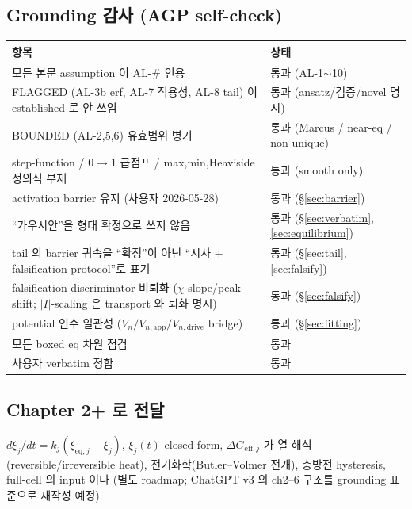 \documentclass[11pt,a4paper]{article}
\newcommand{\eff}{\mathrm{eff}}
\newcommand{\eq}{\mathrm{eq}}
\newcommand{\app}{\mathrm{app}}
\newcommand{\dimedrive}{\mathrm{drive}}
\begin{document}
\subsection{Grounding 감사 (AGP self-check)}
\begin{longtable}{p{} p{}}
\toprule 항목 & 상태 \\ \midrule \endhead
모든 본문 assumption 이 AL-\# 인용 & 통과 (AL-1$\sim$10) \\
FLAGGED (AL-3b erf, AL-7 적용성, AL-8 tail) 이 established 로 안 쓰임 & 통과 (ansatz/검증/novel 명시) \\
BOUNDED (AL-2,5,6) 유효범위 병기 & 통과 (Marcus / near-eq / non-unique) \\
step-function / $0\!\to\!1$ 급점프 / max,min,Heaviside 정의식 부재 & 통과 (smooth only) \\
activation barrier 유지 (사용자 2026-05-28) & 통과 (\S\ref{sec:barrier}) \\
``가우시안''을 형태 확정으로 쓰지 않음 & 통과 (\S\ref{sec:verbatim},\ref{sec:equilibrium}) \\
tail 의 barrier 귀속을 ``확정''이 아닌 ``시사 + falsification protocol''로 표기 & 통과 (\S\ref{sec:tail},\ref{sec:falsify}) \\
falsification discriminator 비퇴화 ($\chi$-slope/peak-shift; $|I|$-scaling 은 transport 와 퇴화 명시) & 통과 (\S\ref{sec:falsify}) \\
potential 인수 일관성 ($V_n/V_{n,\app}/V_{n,\dimedrive}$ bridge) & 통과 (\S\ref{sec:fitting}) \\
모든 boxed eq 차원 점검 & 통과 \\
사용자 verbatim 정합 & 통과 \\
\bottomrule
\end{longtable}

\subsection{Chapter 2+ 로 전달}
$d\xi_j/dt=k_j(\xi_{\eq,j}-\xi_j)$, $\xi_j(t)$ closed-form, $\Delta G_{\eff,j}$ 가 열
해석(reversible/irreversible heat), 전기화학(Butler--Volmer 전개), 충방전 hysteresis,
full-cell 의 input 이다 (별도 roadmap; ChatGPT v3 의 ch2--6 구조를 grounding 표준으로
재작성 예정).
\end{document}
